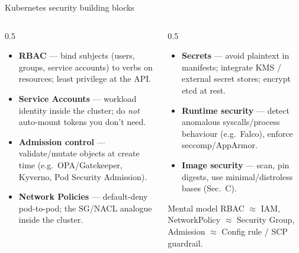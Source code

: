 \documentclass[aspectratio=169,10pt]{beamer}
\newcommand{\term}[1]{{\color{awsink}\textbf{#1}}}
\begin{document}
\begin{frame}{Kubernetes security building blocks}
  \footnotesize
  \begin{columns}[T]
    \begin{column}{0.5\textwidth}
      \begin{itemize}
        \item \term{RBAC} --- bind subjects (users, groups, service accounts) to verbs on resources;
              least privilege at the API.
        \item \term{Service Accounts} --- workload identity inside the cluster; do \emph{not} auto-mount
              tokens you don't need.
        \item \term{Admission control} --- validate/mutate objects at create time
              (e.g.\ OPA/Gatekeeper, Kyverno, Pod Security Admission).
        \item \term{Network Policies} --- default-deny pod-to-pod; the SG/NACL analogue inside the cluster.
      \end{itemize}
    \end{column}
    \begin{column}{0.5\textwidth}
      \begin{itemize}
        \item \term{Secrets} --- avoid plaintext in manifests; integrate KMS / external secret stores;
              encrypt etcd at rest.
        \item \term{Runtime security} --- detect anomalous syscalls/process behaviour
              (e.g.\ Falco), enforce seccomp/AppArmor.
        \item \term{Image security} --- scan, pin digests, use minimal/distroless bases (Sec.~C).
      \end{itemize}
      \begin{block}{\footnotesize Mental model}
        \footnotesize RBAC $\approx$ IAM, NetworkPolicy $\approx$ Security Group,
        Admission $\approx$ Config rule / SCP guardrail.
      \end{block}
    \end{column}
  \end{columns}
\end{frame}
\end{document}
